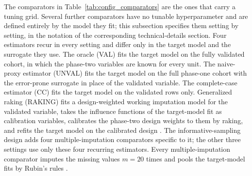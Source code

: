 The comparators in Table~\ref{tab:config_comparators} are the ones that carry a tuning grid. Several further comparators have no tunable hyperparameter and are defined entirely by the model they fit; this subsection specifies them setting by setting, in the notation of the corresponding technical-details section. Four estimators recur in every setting and differ only in the target model and the surrogate they use. The oracle (VAL) fits the target model on the fully validated cohort, in which the phase-two variables are known for every unit. The naive-proxy estimator (UNVAL) fits the target model on the full phase-one cohort with the error-prone surrogate in place of the validated variable. The complete-case estimator (CC) fits the target model on the validated rows only. Generalized raking (RAKING) fits a design-weighted working imputation model for the validated variable, takes the influence functions of the target-model fit as calibration variables, calibrates the phase-two design weights to them by raking, and refits the target model on the calibrated design \citep{deville1992calibration, breslow1988logistic, lumley2011complex}. The informative-sampling design adds four multiple-imputation comparators specific to it; the other three settings use only these four recurring estimators. Every multiple-imputation comparator imputes the missing values $m = 20$ times and pools the target-model fits by Rubin's rules \citep{Rubin1987}.

